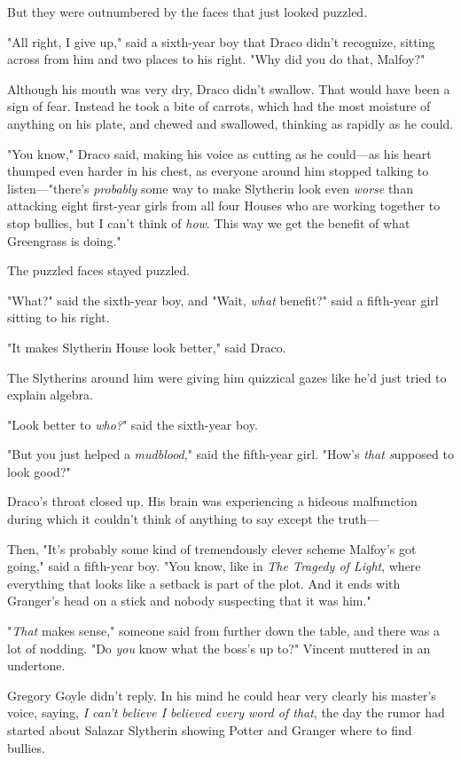 But they were outnumbered by the faces that just looked puzzled.

"All right, I give up," said a sixth-year boy that Draco didn't recognize, 
sitting across from him and two places to his right. "Why did you do that, 
Malfoy?"

Although his mouth was very dry, Draco didn't swallow. That would have been a 
sign of fear. Instead he took a bite of carrots, which had the most moisture of 
anything on his plate, and chewed and swallowed, thinking as rapidly as he 
could.

"You know," Draco said, making his voice as cutting as he could---as his heart 
thumped even harder in his chest, as everyone around him stopped talking to 
listen---"there's \emph{probably} some way to make Slytherin look even 
\emph{worse} than attacking eight first-year girls from all four Houses who are 
working together to stop bullies, but I can't think of \emph{how}. This way we 
get the benefit of what Greengrass is doing."

The puzzled faces stayed puzzled.

"What?" said the sixth-year boy, and "Wait, \emph{what} benefit?" said a 
fifth-year girl sitting to his right.

"It makes Slytherin House look better," said Draco.

The Slytherins around him were giving him quizzical gazes like he'd just tried 
to explain algebra.

"Look better to \emph{who?}" said the sixth-year boy.

"But you just helped a \emph{mudblood}," said the fifth-year girl. "How's 
\emph{that s}upposed to look good?"

Draco's throat closed up. His brain was experiencing a hideous malfunction 
during which it couldn't think of anything to say except the truth---

Then, "It's probably some kind of tremendously clever scheme Malfoy's got 
going," said a fifth-year boy. "You know, like in \emph{The Tragedy of Light}, 
where everything that looks like a setback is part of the plot. And it ends 
with Granger's head on a stick and nobody suspecting that it was him."

"\emph{That} makes sense," someone said from further down the table, and there 
was a lot of nodding.
\sbreak
"Do \emph{you} know what the boss's up to?" Vincent muttered in an undertone.

Gregory Goyle didn't reply. In his mind he could hear very clearly his master's 
voice, saying, \emph{I can't believe I believed every word of that}, the day 
the rumor had started about Salazar Slytherin showing Potter and Granger where 
to find bullies.


